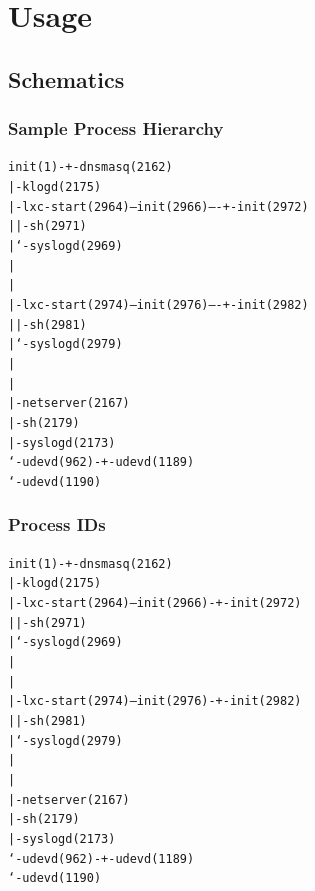 \section{Usage}
\subsection{Schematics}

\begin{frame}[fragile]
\frametitle{Sample Process Hierarchy}
\begin{alltt}\footnotesize
init(1)-+-dnsmasq(2162)
        |-klogd(2175)
        |-lxc-start(2964)---init(2966)----+-init(2972)
        |                                 |-sh(2971)
        |                                 `-syslogd(2969)
        |
        |
        |-lxc-start(2974)---init(2976)----+-init(2982)
        |                                 |-sh(2981)
        |                                 `-syslogd(2979)
        |
        |
        |-netserver(2167)
        |-sh(2179)
        |-syslogd(2173)
        `-udevd(962)-+-udevd(1189)
                     `-udevd(1190)
\end{alltt}\normalsize
\end{frame}

\begin{frame}[fragile]
\frametitle{Process IDs}
\begin{alltt}\footnotesize
init(1)-+-dnsmasq(2162)
        |-klogd(2175)
        |-lxc-start(2964)---init(2966)-+-init(2972)
        |                                 |-sh(2971)
        |                                 `-syslogd(2969)
        |
        |
        |-lxc-start(2974)---init(2976)-+-init(2982)
        |                                 |-sh(2981)
        |                                 `-syslogd(2979)
        |
        |
        |-netserver(2167)
        |-sh(2179)
        |-syslogd(2173)
        `-udevd(962)-+-udevd(1189)
                     `-udevd(1190)
\end{alltt}\normalsize
\end{frame}

